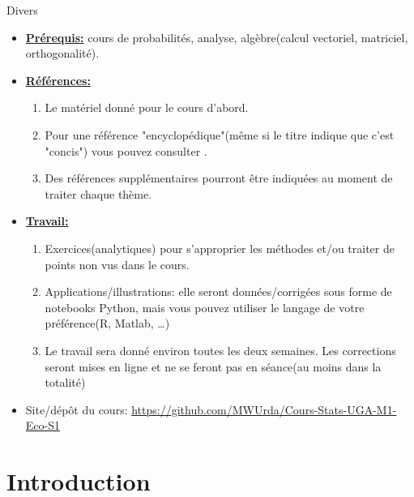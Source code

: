 \begin{frame}[allowframebreaks]{Divers}
    \begin{itemize}
        \item \textbf{\underline{Prérequis:}} cours de probabilités, analyse, algèbre(calcul vectoriel, matriciel, orthogonalité).
        \item \textbf{\underline{Références:}} 
        \begin{enumerate}[-]
            \item Le matériel donné pour le cours d'abord.
            \item Pour une référence "encyclopédique"(même si le titre indique que c'est "concis") 
            vous pouvez consulter  \cite{Wasserman2004}.
            \item Des références supplémentaires pourront être indiquées au moment de traiter chaque thème.
        \end{enumerate}
        \framebreak
        \item \textbf{\underline{Travail:}} \begin{enumerate}
            \item Exercices(analytiques) pour s'approprier les méthodes et/ou traiter 
            de points non vus dans le cours.
            \item Applications/illustrations: elle seront données/corrigées sous forme de notebooks
             Python, mais vous pouvez utiliser le langage de votre préférence(R, Matlab, \ldots)
             \item Le travail sera donné environ toutes les deux semaines. 
             Les corrections seront mises en ligne et ne se feront pas en séance(au moins dans la totalité)
        \end{enumerate}
        \framebreak
        \item Site/dépôt du cours: 
        \medskip
        \url{https://github.com/MWUrda/Cours-Stats-UGA-M1-Eco-S1}
    
    \end{itemize}
    \end{frame}

\section{Introduction}
\frame{\sectionpage}

